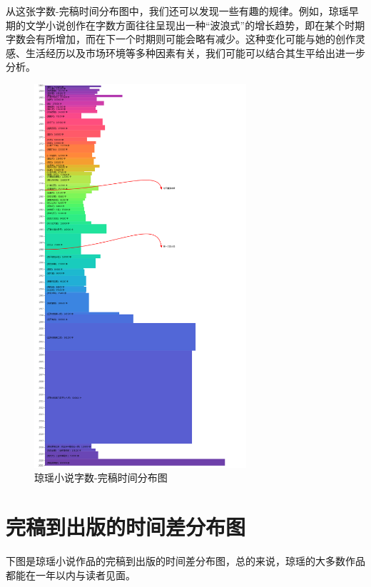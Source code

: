 \documentclass{article}
\begin{document}
从这张字数-完稿时间分布图中，我们还可以发现一些有趣的规律。例如，琼瑶早期的文学小说创作在字数方面往往呈现出一种“波浪式”的增长趋势，即在某个时期字数会有所增加，而在下一个时期则可能会略有减少。这种变化可能与她的创作灵感、生活经历以及市场环境等多种因素有关，我们可能可以结合其生平给出进一步分析。
\begin{figure}[H] %
\centering %
\includegraphics[width=0.7\textwidth]{pic/pic1} %
\caption{琼瑶小说字数-完稿时间分布图} %
\label{Fig.p1} %
\end{figure}

\section{完稿到出版的时间差分布图}

下图是琼瑶小说作品的完稿到出版的时间差分布图，总的来说，琼瑶的大多数作品都能在一年以内与读者见面。
\end{document}
